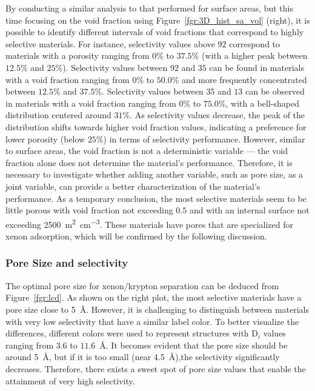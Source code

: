 \documentclass[main.tex]{subfiles}
\begin{document}
By conducting a similar analysis to that performed for surface areas, but this time focusing on the void fraction using Figure~\ref{fgr:3D_hist_sa_vol} (right), it is possible to identify different intervals of void fractions that correspond to highly selective materials. For instance, selectivity values above $92$ correspond to materials with a porosity ranging from {$0$\%} to {$37.5$\%} (with a higher peak between {$12.5$\%} and {$25$\%}). Selectivity values between $92$ and $35$ can be found in materials with a void fraction ranging from {$0$\%} to {$50.0$\%} and more frequently concentrated between {$12.5$\%} and {$37.5$\%}. Selectivity values between $35$ and $13$ can be observed in materials with a void fraction ranging from {$0$\%} to {$75.0$\%}, with a bell-shaped distribution centered around {$31$\%}. As selectivity values decrease, the peak of the distribution shifts towards higher void fraction values, indicating a preference for lower porosity (below {$25$\%}) in terms of selectivity performance. However, similar to surface areas, the void fraction is not a deterministic variable — the void fraction alone does not determine the material's performance. Therefore, it is necessary to investigate whether adding another variable, such as pore size, as a joint variable, can provide a better characterization of the material's performance. As a temporary conclusion, the most selective materials seem to be little porous with void fraction not exceeding $0.5$ and with an internal surface not exceeding \SI{2500}{\square\m\per\cubic\cm}. These materials have pores that are specialized for xenon adsorption, which will be confirmed by the following discussion.

\subsubsection{Pore Size and selectivity}

The optimal pore size for xenon/krypton separation can be deduced from Figure~\ref{fgr:lcd}. As shown on the right plot, the most selective materials have a pore size close to \SI{5}{\angstrom}. However, it is challenging to distinguish between materials with very low selectivity that have a similar label color. To better visualize the differences, different colors were used to represent structures with D$_i$ values ranging from $3.6$ to $11.6$~\si{\angstrom}. It becomes evident that the pore size should be around \SI{5}{\angstrom}, but if it is too small (near \SI{4.5}{\angstrom}),the selectivity significantly decreases. Therefore, there exists a sweet spot of pore size values that enable the attainment of very high selectivity.
\end{document}
